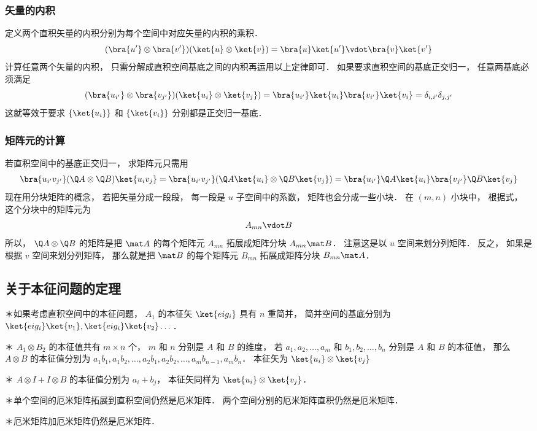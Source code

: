 \subsubsection{矢量的内积}

定义两个直积矢量的内积分别为每个空间中对应矢量的内积的乘积．
\begin{equation}
(\bra{u'}\otimes\bra{v'})(\ket{u}\otimes\ket{v}) = \bra{u}\ket{u'}\vdot\bra{v}\ket{v'}
\end{equation}
计算任意两个矢量的内积， 只需分解成直积空间基底之间的内积再运用以上定律即可． 如果要求直积空间的基底正交归一， 任意两基底必须满足
\begin{equation}
(\bra{u_{i'}} \otimes \bra{v_{j'}})(\ket{u_i} \otimes \ket{v_j}) = \bra{u_{i'}}\ket{u_i} \bra{v_{i'}}\ket{v_i} = \delta_{i,i'}\delta_{j,j'}
\end{equation}
这就等效于要求 $\{\ket{u_i}\}$ 和 $\{\ket{v_i}\}$  分别都是正交归一基底．

\subsubsection{矩阵元的计算}
若直积空间中的基底正交归一， 求矩阵元只需用
\begin{equation}
\bra{u_{i'} v_{j'}} (\Q A \otimes \Q B) \ket{u_i v_j} = \bra{u_{i'} v_{j'}} (\Q A \ket{u_i} \otimes \Q B \ket{v_j}) = \bra{u_{i'}} \Q A \ket{u_i} \bra{v_{j'}} \Q B \ket{v_j}
\end{equation}
现在用分块矩阵的概念， 若把矢量分成一段段， 每一段是 $u$ 子空间中的系数， 矩阵也会分成一些小块． 在 $(m, n)$ 小块中， 根据式， 这个分块中的矩阵元为
\begin{equation}
A_{mn} \vdot B
\end{equation}
所以， $\Q A \otimes \Q B$ 的矩阵是把 $\mat A$ 的每个矩阵元 $A_{mn}$ 拓展成矩阵分块 $A_{mn} \mat B$．  注意这是以 $u$ 空间来划分列矩阵． 反之， 如果是根据 $v$ 空间来划分列矩阵， 那么就是把 $\mat B$ 的每个矩阵元 $B_{mn}$ 拓展成矩阵分块 $B_{mn} \mat A$． 

\subsection{关于本征问题的定理}%
	
＊如果考虑直积空间中的本征问题， $A_1$  的本征矢 $\ket{eig_i}$ 具有 $n$ 重简并， 简并空间的基底分别为 $\ket{eig_i}\ket{v_1}, \ket{eig_i}\ket{v_2}\dots$． 

＊ $A_1 \otimes B_2$ 的本征值共有 $m \times n$ 个， $m$ 和 $n$ 分别是 $A$ 和 $B$ 的维度， 若 $a_1, a_2,\dots, a_m$ 和 $b_1, b_2, \dots, b_n$ 分别是 $A$ 和 $B$ 的本征值， 那么 $A \otimes B$ 的本征值分别为 $a_1 b_1, a_1 b_2, \dots, a_2 b_1, a_2 b_2, \dots, a_m b_{n-1}, a_m b_n$．  本征矢为 $\ket{u_i} \otimes \ket{v_j}$ 

＊ $A \otimes I + I \otimes B$ 的本征值分别为 $a_i + b_j$，  本征矢同样为 $\ket{u_i} \otimes \ket{v_j}$． 

＊单个空间的厄米矩阵拓展到直积空间仍然是厄米矩阵． 两个空间分别的厄米矩阵直积仍然是厄米矩阵． 

＊厄米矩阵加厄米矩阵仍然是厄米矩阵．

